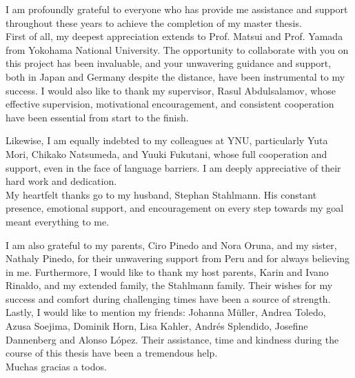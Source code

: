 \begin{acknowledgements}
\addchaptertocentry{\acknowledgementname} %
I am profoundly grateful to everyone who has provide me assistance and support 
throughout these years to achieve the completion of my master thesis.\\

First of all, my deepest appreciation extends to Prof. Matsui and Prof. 
Yamada from Yokohama National University. The opportunity to collaborate with you on this project has 
been invaluable, and your unwavering guidance and support, both in Japan and Germany despite the 
distance, have been instrumental to my success.
I would also like to thank my supervisor, Rasul Abdulsalamov, whose effective supervision,
motivational encouragement, and consistent cooperation have been essential from start to the finish.

Likewise, I am equally indebted to my colleagues at YNU, particularly Yuta Mori, Chikako Natsumeda, and Yuuki Fukutani, 
whose full cooperation and support, even in the face of language barriers. I am deeply appreciative of their hard work and dedication.\\

My heartfelt thanks go to my husband, Stephan Stahlmann. His constant presence, emotional support, 
and encouragement on every step towards my goal meant everything to me.

I am also grateful to my parents, Ciro Pinedo and Nora Oruna, and my sister, Nathaly Pinedo, 
for their unwavering support from Peru and for always believing in me. 
Furthermore, I would like to thank my host parents, Karin and Ivano Rinaldo, and my 
extended family, the Stahlmann family. Their wishes for my success and comfort during challenging times have been
a source of strength.\\

Lastly, I would like to mention my friends: Johanna Müller, Andrea Toledo, Azusa Soejima, Dominik Horn,
Lisa Kahler, Andrés Splendido, Josefine Dannenberg and Alonso López.
Their assistance, time and kindness during the course of this
thesis have been a tremendous help.\\

Muchas gracias a todos.

\end{acknowledgements}
